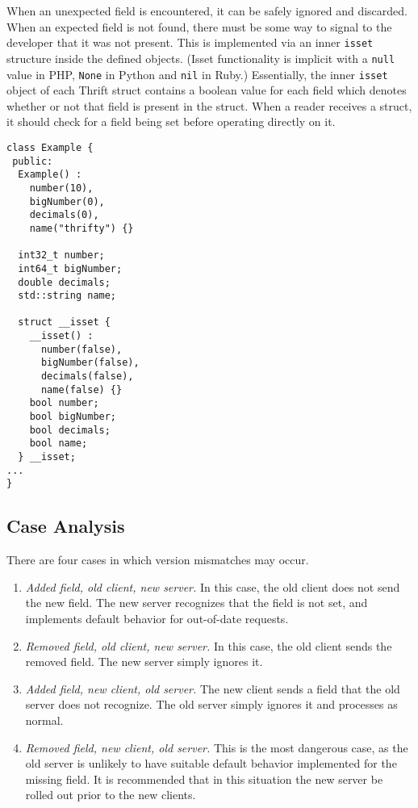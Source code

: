 \documentclass[nocopyrightspace,blockstyle]{sigplanconf}
\begin{document}
When an unexpected field is encountered, it can be safely ignored and
discarded. When an expected field is not found, there must be some way to
signal to the developer that it was not present. This is implemented via an
inner \texttt{isset} structure inside the defined objects. (Isset functionality
is implicit with a \texttt{null} value in PHP, \texttt{None} in Python
and \texttt{nil} in Ruby.) Essentially,
the inner \texttt{isset} object of each Thrift struct contains a boolean value
for each field which denotes whether or not that field is present in the
struct. When a reader receives a struct, it should check for a field being set
before operating directly on it.

\begin{verbatim}
class Example {
 public:
  Example() :
    number(10),
    bigNumber(0),
    decimals(0),
    name("thrifty") {}

  int32_t number;
  int64_t bigNumber;
  double decimals;
  std::string name;

  struct __isset {
    __isset() :
      number(false),
      bigNumber(false),
      decimals(false),
      name(false) {}
    bool number;
    bool bigNumber;
    bool decimals;
    bool name;
  } __isset;
...
}
\end{verbatim}

\subsection{Case Analysis}

There are four cases in which version mismatches may occur.

\begin{enumerate}
\item \textit{Added field, old client, new server.} In this case, the old
client does not send the new field. The new server recognizes that the field
is not set, and implements default behavior for out-of-date requests.
\item \textit{Removed field, old client, new server.} In this case, the old
client sends the removed field. The new server simply ignores it.
\item \textit{Added field, new client, old server.} The new client sends a
field that the old server does not recognize. The old server simply ignores
it and processes as normal.
\item \textit{Removed field, new client, old server.} This is the most
dangerous case, as the old server is unlikely to have suitable default
behavior implemented for the missing field. It is recommended that in this
situation the new server be rolled out prior to the new clients.
\end{enumerate}
\end{document}
